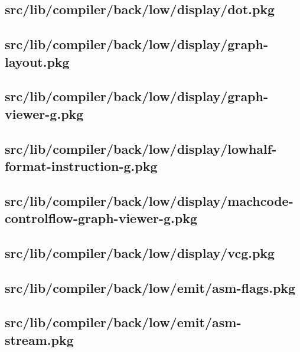 \subsection{src/lib/compiler/back/low/display/dot.pkg}


\subsection{src/lib/compiler/back/low/display/graph-layout.pkg}


\subsection{src/lib/compiler/back/low/display/graph-viewer-g.pkg}


\subsection{src/lib/compiler/back/low/display/lowhalf-format-instruction-g.pkg}


\subsection{src/lib/compiler/back/low/display/machcode-controlflow-graph-viewer-g.pkg}


\subsection{src/lib/compiler/back/low/display/vcg.pkg}


\subsection{src/lib/compiler/back/low/emit/asm-flags.pkg}


\subsection{src/lib/compiler/back/low/emit/asm-stream.pkg}



